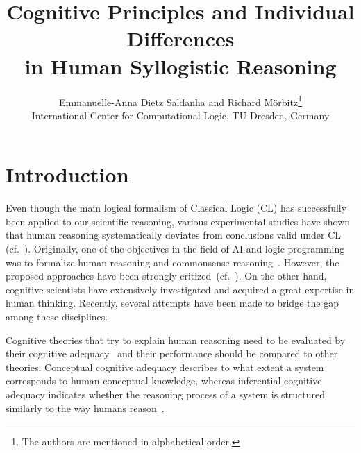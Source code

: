 \documentclass[12pt]{article}
\title{Cognitive Principles and Individual Differences \\ in Human Syllogistic Reasoning}
\author{
Emmanuelle-Anna Dietz Saldanha and Richard M{\"o}rbitz\thanks{The authors are mentioned in alphabetical order.} \\
\normalsize International Center for Computational Logic, TU
  Dresden, Germany
}
\date{}
\begin{document}
\maketitle

\section{Introduction}
% 
% 

Even though the main logical formalism of Classical Logic (CL) has successfully been applied to our scientific reasoning,
various experimental studies have shown that human reasoning systematically deviates 
from conclusions valid under CL (cf.~\cite{wason:68,byrne:89}).
Originally, one of the objectives in the field of AI and logic programming was to formalize human reasoning and commonsense reasoning~\cite{McCarthy59,McCarthy98}. 
However, the proposed approaches have been strongly critized~(cf.~\cite{mcdermott:87}).
On the other hand, cognitive scientists have extensively investigated and acquired a great expertise
in human thinking. Recently, several attempts have been made to bridge the gap among these disciplines. 


Cognitive theories that try to explain human reasoning need to be evaluated by their cognitive adequacy~\cite{strube:1992} and their performance should be compared to other theories.
Conceptual cognitive adequacy describes to what extent a system corresponds to human conceptual knowledge, whereas inferential cognitive adequacy indicates whether the reasoning process of a system is structured similarly to the way humans reason~\cite{knauff:rauh:renz:1997}. 
\end{document}
